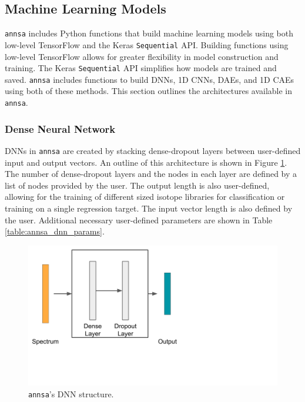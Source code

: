 \subsection{Machine Learning Models}

\verb|annsa| includes Python functions that build machine learning models using both low-level TensorFlow and the Keras \verb|Sequential| API. Building functions using low-level TensorFlow allows for greater flexibility in model construction and training. The Keras \verb|Sequential| API simplifies how models are trained and saved. \verb|annsa| includes functions to build DNNs, 1D CNNs, DAEs, and 1D CAEs using both of these methods. This section outlines the architectures available in \verb|annsa|.

\subsubsection{Dense Neural Network}

DNNs in \verb|annsa| are created by stacking dense-dropout layers between user-defined input and output vectors. An outline of this architecture is shown in Figure \ref{fig:annsa_dnn}. The number of dense-dropout layers and the nodes in each layer are defined by a list of nodes provided by the user. The output length is also user-defined, allowing for the training of different sized isotope libraries for classification or training on a single regression target. The input vector length is also defined by the user. Additional necessary user-defined parameters are shown in Table \ref{table:annsa_dnn_params}.

\begin{figure}[H]
\centering
\includegraphics[trim=0 110 380 0,clip,width=0.6\linewidth]{images/annsa_dnn.png}
\caption{\texttt{annsa}'s DNN structure.}
\label{fig:annsa_dnn}
\end{figure}

